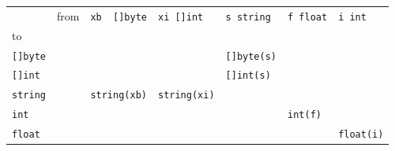 \begin{tabular}{lllllll}
\toprule
    &  from	&  \verb|xb  []byte|	    & \verb|xi []int| & \verb|s string|     &	\verb|f float|  &  \verb|i int|	\\
to		 &		&		    &		    &			    &			& \\
\verb|[]byte|    &		&		    &		    & \verb|[]byte(s)|	    &			& \\
\verb|[]int|     &		&		    &		    & \verb|[]int(s)|	    &			& \\
\verb|string|    &		&  \verb|string(xb)| &\verb|string(xi)|	    &		    &			& \\
\verb|int|	 &		&		    &		    &			    & \verb|int(f)|	& \\
\verb|float|	 &		&		    &		    &			    &			& \verb|float(i)| \\
\end{tabular}
